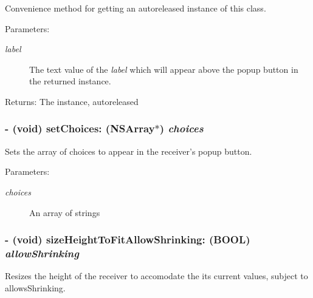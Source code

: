 Convenience method for getting an autoreleased instance of this class. 

\begin{Desc}
\item[Parameters:]
\begin{description}
\item[{\em label}]The text value of the {\em label\/} which will appear above the popup button in the returned instance. \end{description}
\end{Desc}
\begin{Desc}
\item[Returns:]The instance, autoreleased \end{Desc}
\hypertarget{interface_s_s_y_labelled_pop_up_284d5bef6c5b4e71542cbe3d2002700f}{
\subsubsection[{setChoices:}]{\setlength{\rightskip}{0pt plus 5cm}- (void) setChoices: (NSArray$\ast$) {\em choices}}}
\label{interface_s_s_y_labelled_pop_up_284d5bef6c5b4e71542cbe3d2002700f}


Sets the array of choices to appear in the receiver's popup button. 

\begin{Desc}
\item[Parameters:]
\begin{description}
\item[{\em choices}]An array of strings \end{description}
\end{Desc}
\hypertarget{interface_s_s_y_labelled_pop_up_04f741810a59176da8704390e4d95a57}{
\subsubsection[{sizeHeightToFitAllowShrinking:}]{\setlength{\rightskip}{0pt plus 5cm}- (void) sizeHeightToFitAllowShrinking: (BOOL) {\em allowShrinking}}}
\label{interface_s_s_y_labelled_pop_up_04f741810a59176da8704390e4d95a57}


Resizes the height of the receiver to accomodate the its current values, subject to allowsShrinking. 

